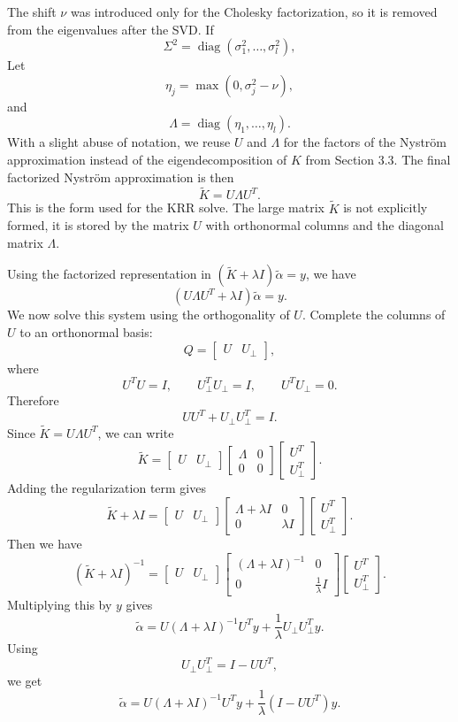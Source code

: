 The shift $\nu$ was introduced only for the Cholesky factorization, so it is removed from
the eigenvalues after the SVD. If
\[
\Sigma^2=\operatorname{diag}(\sigma_1^2,\ldots,\sigma_l^2),
\]
Let
\[
\eta_j=\max(0,\sigma_j^2-\nu),
\]
and
\[
\Lambda=\operatorname{diag}(\eta_1,\ldots,\eta_l).
\] With a slight abuse of notation, we reuse $U$ and $\Lambda$ for the factors of the Nystr\"om approximation instead of the eigendecomposition of $K$ from Section 3.3.
The final factorized Nystr\"om approximation is then
\[
\tilde K=U\Lambda U^T.
\]
This is the form used for the KRR solve. The large matrix $\tilde K$ is not explicitly
formed, it is stored by the matrix $U$ with orthonormal columns and the diagonal matrix $\Lambda$.

Using the factorized representation in $(\tilde K+\lambda I)\tilde\alpha=y$, we have
\[
(U\Lambda U^T+\lambda I)\tilde\alpha=y.
\]
We now solve this system using the orthogonality of $U$. Complete the columns of $U$ to an
orthonormal basis:
\[
Q=
\begin{bmatrix}
U & U_\perp
\end{bmatrix},
\]
where
\[
U^TU=I, \qquad U_\perp^TU_\perp=I, \qquad U^TU_\perp=0.
\]
Therefore
\[
UU^T+U_\perp U_\perp^T=I.
\]
Since $\tilde K=U\Lambda U^T$, we can write
\[
\tilde K=
\begin{bmatrix}
U & U_\perp
\end{bmatrix}
\begin{bmatrix}
\Lambda & 0 \\
0 & 0
\end{bmatrix}
\begin{bmatrix}
U^T \\
U_\perp^T
\end{bmatrix}.
\]
Adding the regularization term gives
\[
\tilde K+\lambda I=
\begin{bmatrix}
U & U_\perp
\end{bmatrix}
\begin{bmatrix}
\Lambda+\lambda I & 0 \\
0 & \lambda I
\end{bmatrix}
\begin{bmatrix}
U^T \\
U_\perp^T
\end{bmatrix}.
\]
Then we have
\[
(\tilde K+\lambda I)^{-1}
=
\begin{bmatrix}
U & U_\perp
\end{bmatrix}
\begin{bmatrix}
(\Lambda+\lambda I)^{-1} & 0 \\
0 & \frac{1}{\lambda}I
\end{bmatrix}
\begin{bmatrix}
U^T \\
U_\perp^T
\end{bmatrix}.
\]
Multiplying this by $y$ gives
\[
\tilde\alpha=U(\Lambda+\lambda I)^{-1}U^Ty+\frac{1}{\lambda}U_\perp U_\perp^Ty.
\]
Using
\[
U_\perp U_\perp^T=I-UU^T,
\]
we get
\[
\tilde\alpha=U(\Lambda+\lambda I)^{-1}U^Ty+\frac{1}{\lambda}(I-UU^T)y.
\]

